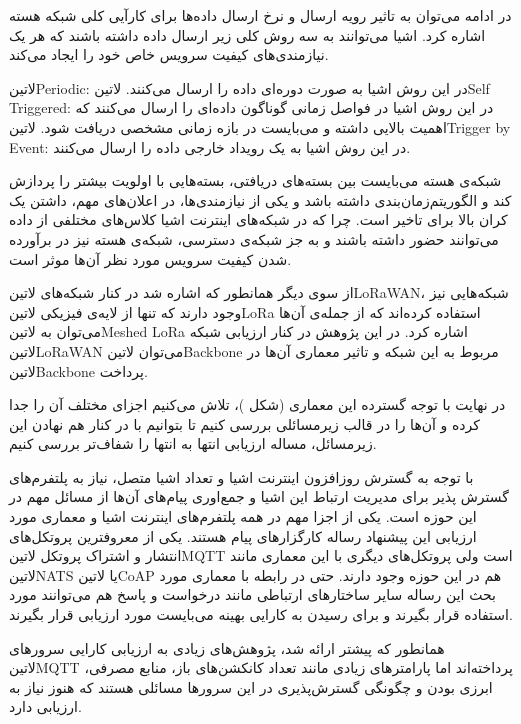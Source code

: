 در ادامه می‌توان به تاثیر رویه ارسال و نرخ ارسال داده‌ها برای کارآیی کلی شبکه هسته اشاره کرد.
اشیا می‌توانند به سه روش کلی زیر ارسال داده داشته باشند که هر یک نیازمندی‌های کیفیت سرویس خاص خود را ایجاد می‌کند.

 ‌لاتین{Periodic}: در این روش اشیا به صورت دوره‌ای داده را ارسال می‌کنند.
 ‌لاتین{Self Triggered}: در این روش اشیا در فواصل زمانی گوناگون داده‌ای را ارسال می‌کنند که اهمیت بالایی داشته و می‌بایست در بازه زمانی مشخصی دریافت شود.
 ‌لاتین{Trigger by Event}: در این روش اشیا به یک رویداد خارجی داده را ارسال می‌کنند.

شبکه‌ی هسته می‌بایست بین بسته‌های دریافتی، بسته‌هایی با اولویت بیشتر را پردازش کند و الگوریتم‌زمان‌بندی داشته باشد و یکی از نیازمندی‌ها، در اعلان‌های مهم، داشتن یک کران بالا برای تاخیر است.
چرا که در شبکه‌های اینترنت اشیا کلاس‌های مختلفی از داده می‌توانند حضور داشته باشند و به جز شبکه‌ی دسترسی، شبکه‌ی هسته نیز در برآورده شدن کیفیت سرویس مورد نظر آن‌ها موثر است.

از سوی دیگر همانطور که اشاره شد در کنار شبکه‌های ‌لاتین{LoRaWAN}، شبکه‌هایی نیز وجود دارند
که تنها از لایه‌ی فیزیکی ‌لاتین{LoRa} استفاده کرده‌اند که از جمله‌ی آن‌ها می‌توان به ‌لاتین{Meshed LoRa}
اشاره کرد. در این پژوهش در کنار ارزیابی شبکه ‌لاتین{LoRaWAN} می‌توان ‌لاتین{Backbone} مربوط
به این شبکه و تاثیر معماری آن‌ها در ‌لاتین{Backbone} پرداخت.

در نهایت با توجه گسترده این معماری (شکل )،
تلاش می‌کنیم اجزای مختلف آن را جدا کرده و آن‌ها را در قالب زیرمسائلی بررسی کنیم تا بتوانیم
با در کنار هم نهادن این زیرمسائل، مساله ارزیابی انتها به انتها را شفاف‌تر بررسی کنیم.


با توجه به گسترش روزافزون اینترنت اشیا و تعداد اشیا متصل، نیاز به پلتفرم‌های گسترش پذیر برای مدیریت ارتباط این اشیا و جمع‌اوری پیام‌های آن‌ها
از مسائل مهم در این حوزه است. یکی از اجزا مهم در همه پلتفرم‌های اینترنت اشیا و معماری مورد ارزیابی این پیشنهاد رساله کارگزار‌های پیام هستند. یکی از
معروفترین پروتکل‌های انتشار و اشتراک پروتکل ‌لاتین{MQTT} است ولی پروتکل‌های دیگری با این معماری مانند ‌لاتین{NATS} یا
‌لاتین{CoAP} هم در این حوزه وجود دارند. حتی در رابطه با معماری مورد بحث این رساله سایر ساختارهای ارتباطی مانند درخواست و پاسخ
هم می‌توانند مورد استفاده قرار بگیرند و برای رسیدن به کارایی بهینه می‌بایست مورد ارزیابی قرار بگیرند.

همانطور که پیشتر ارائه شد، پژوهش‌های زیادی به ارزیابی کارایی سرورهای ‌لاتین{MQTT} پرداخته‌اند اما پارامترهای زیادی مانند تعداد کانکشن‌های باز،
منابع مصرفی، ابرزی بودن و چگونگی گسترش‌پذیری در این سرورها مسائلی هستند که هنوز نیاز به ارزیابی دارد.

